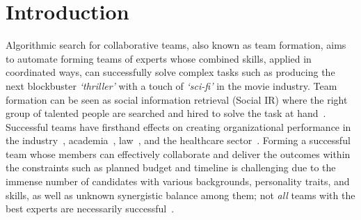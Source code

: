 \documentclass[runningheads]{llncs}
\begin{document}
\section{Introduction}
Algorithmic search for collaborative teams, also known as team formation, aims to automate forming teams of experts whose combined skills, applied in coordinated ways, can successfully solve complex tasks such as producing the next blockbuster \textit{`thriller'} with a touch of \textit{`sci-fi'} in the movie industry. Team formation can be seen as social information retrieval (Social IR) where the right group of talented people are searched and hired to solve the task at hand~\cite{10.1145/1772690.1772735,10.1145/2133806.2133830}. Successful teams have firsthand effects on creating organizational performance in the industry~\cite{156562,math8101804,Kairgalievna2021THEEO}, academia~\cite{YouEtAl99,doi:10.1146/annurev-soc-081715-074219,teamscience}, law~\cite{doi:10.1177/001979399504800405,Hu2014MakingAD}, and the healthcare sector~\cite{PMID:26182585,Rosen2018433}. Forming a successful team whose members can effectively collaborate and deliver the outcomes within the constraints such as planned budget and timeline is challenging due to the immense number of candidates with various backgrounds, personality traits, and skills, as well as unknown synergistic balance among them; not \textit{all} teams with the best experts are necessarily successful~\cite{doi:10.1177/0956797614537280}.
\end{document}
